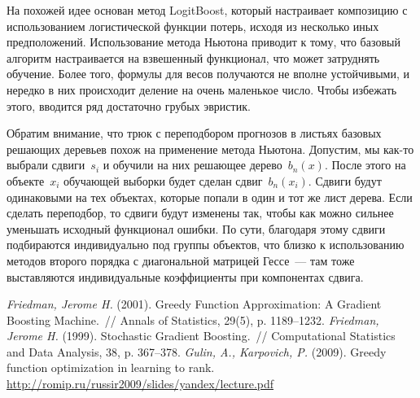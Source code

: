 \documentclass[12pt,fleqn]{article}
\begin{document}
На похожей идее основан метод LogitBoost, который настраивает композицию с использованием логистической функции потерь,
исходя из несколько иных предположений.
Использование метода Ньютона приводит к тому, что базовый алгоритм настраивается на взвешенный функционал,
что может затруднять обучение.
Более того, формулы для весов получаются не вполне устойчивыми, и нередко в них происходит деление на очень маленькое число.
Чтобы избежать этого, вводится ряд достаточно грубых эвристик.

Обратим внимание, что трюк с переподбором прогнозов в листьях базовых решающих деревьев
похож на применение метода Ньютона.
Допустим, мы как-то выбрали сдвиги~$s_i$ и обучили на них решающее дерево~$b_n(x)$.
После этого на объекте~$x_i$ обучающей выборки будет сделан сдвиг~$b_n(x_i)$.
Сдвиги будут одинаковыми на тех объектах, которые попали в один и тот же лист дерева.
Если сделать переподбор, то сдвиги будут изменены так, чтобы как можно сильнее уменьшать
исходный функционал ошибки.
По сути, благодаря этому сдвиги подбираются индивидуально под группы объектов,
что близко к использованию методов второго порядка с диагональной матрицей Гессе~---
там тоже выставляются индивидуальные коэффициенты при компонентах сдвига.


\begin{thebibliography}{1}
    \emph{Friedman, Jerome H.} (2001).
    Greedy Function Approximation: A Gradient Boosting Machine.~//
    Annals of Statistics,
    29(5), p. 1189--1232.
    \emph{Friedman, Jerome H.} (1999).
    Stochastic Gradient Boosting.~//
    Computational Statistics and Data Analysis,
    38, p. 367--378.
    \emph{Gulin, A., Karpovich, P.} (2009).
    Greedy function optimization in learning to rank.\\
    \url{http://romip.ru/russir2009/slides/yandex/lecture.pdf}
\end{thebibliography}
\end{document}
